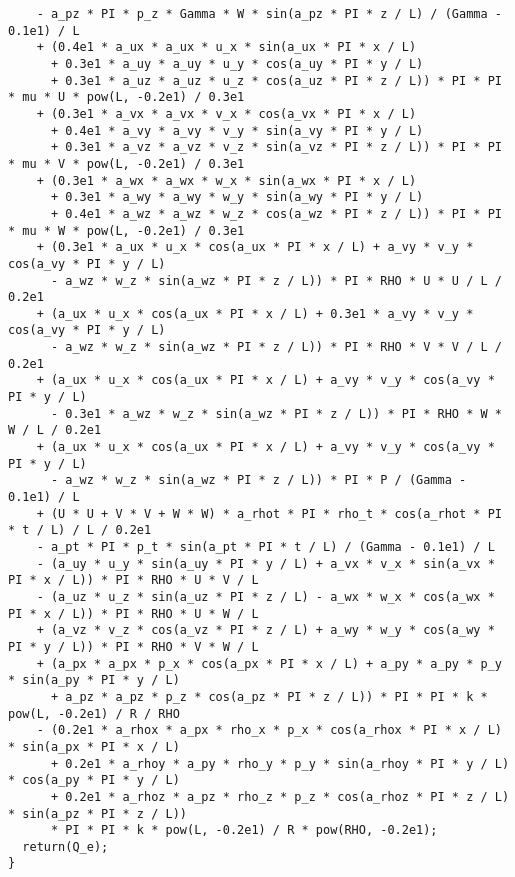 \documentclass[10pt]{article}
\begin{document}
\begin{small}
\begin{verbatim}
    - a_pz * PI * p_z * Gamma * W * sin(a_pz * PI * z / L) / (Gamma - 0.1e1) / L
    + (0.4e1 * a_ux * a_ux * u_x * sin(a_ux * PI * x / L)
      + 0.3e1 * a_uy * a_uy * u_y * cos(a_uy * PI * y / L)
      + 0.3e1 * a_uz * a_uz * u_z * cos(a_uz * PI * z / L)) * PI * PI * mu * U * pow(L, -0.2e1) / 0.3e1
    + (0.3e1 * a_vx * a_vx * v_x * cos(a_vx * PI * x / L)
      + 0.4e1 * a_vy * a_vy * v_y * sin(a_vy * PI * y / L)
      + 0.3e1 * a_vz * a_vz * v_z * sin(a_vz * PI * z / L)) * PI * PI * mu * V * pow(L, -0.2e1) / 0.3e1
    + (0.3e1 * a_wx * a_wx * w_x * sin(a_wx * PI * x / L)
      + 0.3e1 * a_wy * a_wy * w_y * sin(a_wy * PI * y / L)
      + 0.4e1 * a_wz * a_wz * w_z * cos(a_wz * PI * z / L)) * PI * PI * mu * W * pow(L, -0.2e1) / 0.3e1
    + (0.3e1 * a_ux * u_x * cos(a_ux * PI * x / L) + a_vy * v_y * cos(a_vy * PI * y / L)
      - a_wz * w_z * sin(a_wz * PI * z / L)) * PI * RHO * U * U / L / 0.2e1
    + (a_ux * u_x * cos(a_ux * PI * x / L) + 0.3e1 * a_vy * v_y * cos(a_vy * PI * y / L)
      - a_wz * w_z * sin(a_wz * PI * z / L)) * PI * RHO * V * V / L / 0.2e1
    + (a_ux * u_x * cos(a_ux * PI * x / L) + a_vy * v_y * cos(a_vy * PI * y / L)
      - 0.3e1 * a_wz * w_z * sin(a_wz * PI * z / L)) * PI * RHO * W * W / L / 0.2e1
    + (a_ux * u_x * cos(a_ux * PI * x / L) + a_vy * v_y * cos(a_vy * PI * y / L)
      - a_wz * w_z * sin(a_wz * PI * z / L)) * PI * P / (Gamma - 0.1e1) / L
    + (U * U + V * V + W * W) * a_rhot * PI * rho_t * cos(a_rhot * PI * t / L) / L / 0.2e1
    - a_pt * PI * p_t * sin(a_pt * PI * t / L) / (Gamma - 0.1e1) / L
    - (a_uy * u_y * sin(a_uy * PI * y / L) + a_vx * v_x * sin(a_vx * PI * x / L)) * PI * RHO * U * V / L
    - (a_uz * u_z * sin(a_uz * PI * z / L) - a_wx * w_x * cos(a_wx * PI * x / L)) * PI * RHO * U * W / L
    + (a_vz * v_z * cos(a_vz * PI * z / L) + a_wy * w_y * cos(a_wy * PI * y / L)) * PI * RHO * V * W / L
    + (a_px * a_px * p_x * cos(a_px * PI * x / L) + a_py * a_py * p_y * sin(a_py * PI * y / L)
      + a_pz * a_pz * p_z * cos(a_pz * PI * z / L)) * PI * PI * k * pow(L, -0.2e1) / R / RHO
    - (0.2e1 * a_rhox * a_px * rho_x * p_x * cos(a_rhox * PI * x / L) * sin(a_px * PI * x / L)
      + 0.2e1 * a_rhoy * a_py * rho_y * p_y * sin(a_rhoy * PI * y / L) * cos(a_py * PI * y / L)
      + 0.2e1 * a_rhoz * a_pz * rho_z * p_z * cos(a_rhoz * PI * z / L) * sin(a_pz * PI * z / L))
      * PI * PI * k * pow(L, -0.2e1) / R * pow(RHO, -0.2e1);
  return(Q_e);
}
\end{verbatim}
\end{small}
 

\end{document}
